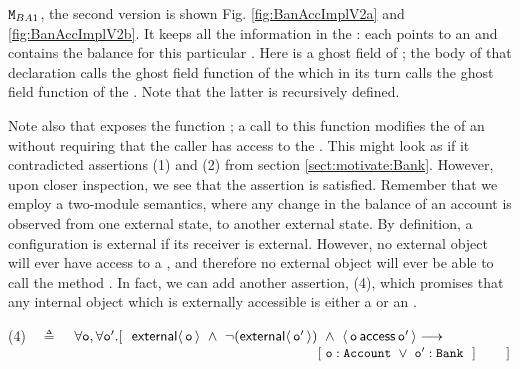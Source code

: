 ${\mbox{\tt{\ensuremath{{\mbox{\tt{M}}}}}}}_{BA1}$, the second version is shown Fig. \ref{fig:BanAccImplV2a} and \ref{fig:BanAccImplV2b}. It keeps all the information 
in the : each  points to an  
and contains the balance for this particular . Here  is a
ghost field of ; the body of that declaration calls the ghost field function  of the  which in its
turn calls the ghost field function  of the . Note that the latter is recursively defined.

Note also that  exposes the function ; a call to this function   modifies the  of an  without requiring that the caller has access to the . This might look as if it contradicted assertions (1) and  (2)
  from section \ref{sect:motivate:Bank}. However, upon closer inspection, we see that the assertion is satisfied. Remember that we employ a two-module semantics, where any change in the balance of an account is observed from one external state, to another external state. By definition, a configuration is external if its receiver is external.  However, no external object will ever have access to a , and therefore no external object will ever be able to call the method . In fact, we can add another assertion, (4), which promises that any internal object which is externally accessible is either a  or an .

(4)\ \  $\triangleq$\ \ $\forall \prg{o},\forall \prg{o}'.[\ \ \External{ \prg{o}}\  \wedge\ \neg (\External{ \prg{o}'}) \ \wedge\  \CanAccess{\prg{o}}{\prg{o}'}     
    \longrightarrow \ \    \hfill$ \\
  $\strut \hspace{8.3cm} 
  [\    \prg{o}:\prg{Account}\ \vee \ \prg{o}':\prg{Bank}\  \ ]\ \ \  \ \ \ \ ] \hfill $


